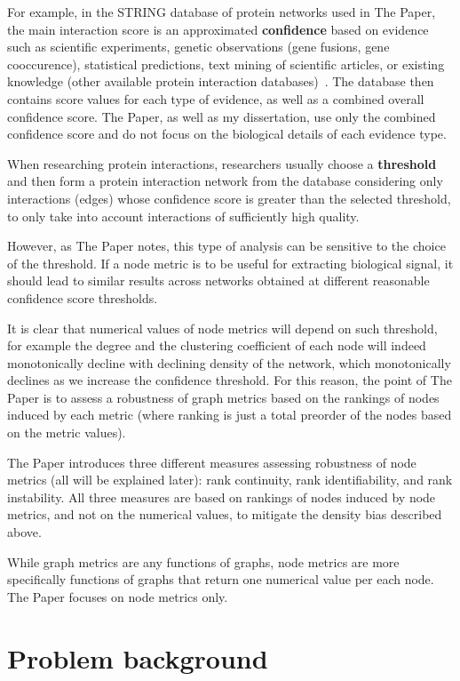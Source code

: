 For example, in the STRING database of protein networks used in The Paper, the main interaction score is an approximated \textbf{confidence} based on evidence such as scientific experiments, genetic observations (gene fusions, gene cooccurence), statistical predictions, text mining of scientific articles, or existing knowledge (other available protein interaction databases)~\cite{Szklarczyk2019}.
The database then contains score values for each type of evidence, as well as a combined overall confidence score.
The Paper, as well as my dissertation, use only the combined confidence score and do not focus on the biological details of each evidence type.

When researching protein interactions, researchers usually choose a \textbf{threshold} and then form a protein interaction network from the database considering only interactions (edges) whose confidence score is greater than the selected threshold, to only take into account interactions of sufficiently high quality.

However, as The Paper notes, this type of analysis can be sensitive to the choice of the threshold.
If a node metric is to be useful for extracting biological signal, it should lead to similar results across networks obtained at different reasonable confidence score thresholds.

It is clear that numerical values of node metrics will depend on such threshold, for example the degree and the clustering coefficient of each node will indeed monotonically decline with declining density of the network, which monotonically declines as we increase the confidence threshold.
For this reason, the point of The Paper is to assess a robustness of graph metrics based on the rankings of nodes induced by each metric (where ranking is just a total preorder of the nodes based on the metric values).

The Paper introduces three different measures assessing robustness of node metrics (all will be explained later): rank continuity, rank identifiability, and rank instability.
All three measures are based on rankings of nodes induced by node metrics, and not on the numerical values, to mitigate the density bias described above.

While graph metrics are any functions of graphs, node metrics are more specifically functions of graphs that return one numerical value per each node.
The Paper focuses on node metrics only.


\section{Problem background}

